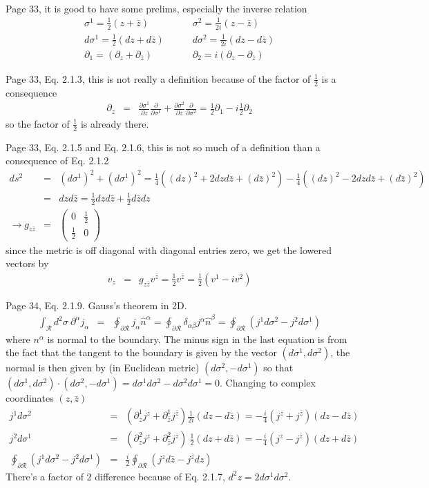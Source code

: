 \documentclass[aps,preprint,preprintnumbers,nofootinbib,showpacs,prd]{revtex4-1}
\newcommand{\nbea}{\begin{eqnarray*}}
\newcommand{\neea}{\end{eqnarray*}}
\begin{document}
{\ }

Page 33, it is good to have some prelims, especially the inverse relation
%
\nbea
\sigma^1 = \frac{1}{2} (z + \bar z) & ~~~~~~ & \sigma^2 = \frac{1}{2i} (z - \bar z) \\
d\sigma^1 = \frac{1}{2} (dz + d\bar z) & ~~~~~~ & d\sigma^2 = \frac{1}{2i} (dz - d\bar z) \\
\partial_1 = (\partial_z + \partial_{\bar z}) & ~~~~~~ & \partial_2 = i (\partial_z - \partial_{\bar z})
\neea
%

Page 33, Eq. 2.1.3, this is not really a definition because of the factor of $\frac{1}{2}$ is a consequence
%
\nbea
\partial_z & = & \frac{\partial \sigma^1}{\partial z} \frac{\partial}{\partial\sigma^1} + \frac{\partial \sigma^2}{\partial z} \frac{\partial}{\partial\sigma^2} = \frac{1}{2} \partial_1 - i \frac{1}{2} \partial_2
\neea
%
so the factor of $\frac{1}{2}$ is already there.

Page 33, Eq. 2.1.5 and Eq. 2.1.6, this is not so much of a definition than a consequence of Eq. 2.1.2
%
\nbea
ds^2 & = & (d\sigma^1)^2 + (d\sigma^1)^2 = \frac{1}{4} ((dz)^2 + 2 dz d\bar z + (d \bar z)^2) - \frac{1}{4} ((dz)^2 - 2 dz d\bar z + (d \bar z)^2) \\
& = & dz d\bar z = \frac{1}{2} dz d\bar z + \frac{1}{2} d\bar z dz \\
\rightarrow g_{z\bar z} & = &
\left ( \begin{array}{cc}
0 & \frac{1}{2} \\
\frac{1}{2} & 0
\end{array} \right )
\neea
%
since the metric is off diagonal with diagonal entries zero, we get the lowered vectors by
%
\nbea
v_z & = & g_{z\bar z} v^{\bar z} = \frac{1}{2} v^{\bar z} = \frac{1}{2} (v^1 - i v^2)
\neea
%

Page 34, Eq. 2.1.9. Gauss's theorem in 2D. 
%
\nbea
\int_{\mathcal{R}} d^2\sigma~\partial^\alpha j_\alpha & = & \oint_{\partial \mathcal{R}} j_\alpha \hat n^\alpha = \oint_{\partial \mathcal{R}} \delta_{\alpha\beta} j^\alpha \hat n^\beta = \oint_{\partial \mathcal{R}} \left (j^1 d\sigma^2 - j^2 d\sigma^1 \right )
\neea
%
where $n^\alpha$ is normal to the boundary. The minus sign in the last equation is from the fact that the tangent to the boundary is given by the vector $(d\sigma^1,d\sigma^2)$, the normal is then given by (in Euclidean metric) $(d\sigma^2,-d\sigma^1)$ so that $(d\sigma^1,d\sigma^2) \cdot (d\sigma^2,-d\sigma^1) = d\sigma^1 d\sigma^2 - d\sigma^2 d\sigma^1 = 0$. Changing to complex coordinates $(z, \bar z)$
%
\nbea
j^1 d\sigma^2 & = & (\partial _z^1 j^z + \partial _{\bar z}^1 j^{\bar z}) \frac{1}{2i} (dz - d\bar z) = -\frac{i}{4} (j^z + j^{\bar z}) (dz - d\bar z) \\
j^2 d\sigma^1 & = & (\partial_z^2 j^z + \partial_{\bar z}^2 j^{\bar z}) ~\frac{1}{2} (dz + d\bar z) = -\frac{i}{4}(j^z - j^{\bar z}) (dz + d\bar z) \\
\oint_{\partial \mathcal{R}} \left (j^1 d\sigma^2 - j^2 d\sigma^1 \right ) & = & \frac{i}{2} \oint_{\partial \mathcal{R}} \left (j^z d\bar z - j^{\bar z} dz \right ) 
\neea
%
There's a factor of 2 difference because of Eq. 2.1.7, $d^2z = 2 d\sigma^1d\sigma^2$.
\end{document}
